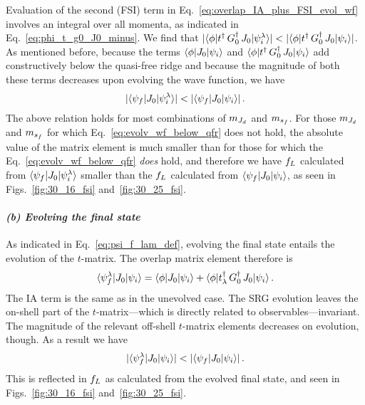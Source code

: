 	Evaluation of the second (FSI) term in
	Eq.~\eqref{eq:overlap_IA_plus_FSI_evol_wf} involves an integral over all
	momenta, as indicated in Eq.~\eqref{eq:phi_t_g0_J0_minus}.  We find that
	$|\langle \phi|t^\dag \, G_0^\dag \, J_0|\psi_i^\lambda\rangle| <
	|\langle \phi|t^\dag \, G_0^\dag \, J_0|\psi_i\rangle|$.  As mentioned
	before, because the terms $\langle \phi|J_0|\psi_i\rangle$ and
	$\langle \phi|t^\dag \, G_0^\dag \, J_0|\psi_i\rangle$ add constructively
	below the quasi-free ridge and because the magnitude of both these terms
	decreases upon evolving the wave function, we have
	\begin{equation}
	 |\langle \psi_f|J_0|\psi_i^\lambda\rangle| < |\langle \psi_f|J_0|\psi_i\rangle|
	\label{eq:evolv_wf_below_qfr} \,.
	\end{equation}
	The above relation holds for most combinations of $m_{J_d}$ and $m_{s_f}$.  For
	those	$m_{J_d}$ and $m_{s_f}$ for which Eq.~\eqref{eq:evolv_wf_below_qfr} does not
	hold,	the absolute value of the matrix element is much smaller than for those
	for	which the Eq.~\eqref{eq:evolv_wf_below_qfr} \emph{does} hold, and
	therefore we have $f_L$ calculated from $\langle \psi_f|J_0|\psi_i^\lambda\rangle$ smaller than the
	$f_L$ calculated from $\langle \psi_f|J_0|\psi_i\rangle$, as seen in
	Figs.~\ref{fig:30_16_fsi} and~\ref{fig:30_25_fsi}.

	\paragraph{\emph{(b) Evolving the final state}}  As indicated in
	Eq.~\eqref{eq:psi_f_lam_def}, evolving the final state entails
	the evolution of the $t$-matrix.  The overlap matrix element therefore is
	\begin{equation}
	 \langle \psi_f^\lambda|J_0|\psi_i\rangle
	 = \langle \phi|J_0|\psi_i\rangle
	 + \langle \phi|t^\dag_\lambda \, G_0^\dag \, J_0|\psi_i\rangle \,.
	\label{eq:evol_final_state_overlap}
	\end{equation}
	The IA term is the same as in the unevolved case.  The SRG evolution leaves the
	on-shell part of the $t$-matrix---which is directly related to
	observables---invariant.  The magnitude of the relevant off-shell $t$-matrix
	elements decreases
	on evolution, though.  As a result we have
	\begin{equation}
	|\langle \psi_f^\lambda|J_0|\psi_i\rangle| < |\langle \psi_f|J_0|\psi_i\rangle| \,.
	\end{equation}
	This is reflected in $f_L$ as calculated from the evolved final state, and
	seen in Figs.~\ref{fig:30_16_fsi} and~\ref{fig:30_25_fsi}.

